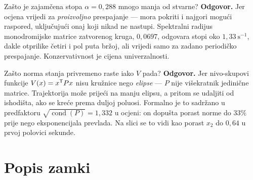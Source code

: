 \begin{pitanje}{Zašto je zajamčena stopa $\alpha = 0{,}288$ mnogo manja od stvarne?}
\textbf{Odgovor.} Jer ocjena vrijedi za \emph{proizvoljno} prespajanje --- mora
pokriti i najgori mogući raspored, uključujući onaj koji nikad ne nastupi.
Spektralni radijus monodromijske matrice zatvorenog kruga, $0{,}0697$, odgovara
stopi oko $1{,}33\ \mathrm{s}^{-1}$, dakle otprilike četiri i pol puta bržoj, ali
vrijedi samo za zadano periodičko prespajanje. Konzervativnost je cijena
univerzalnosti.
\end{pitanje}

\begin{pitanje}{Zašto norma stanja privremeno raste iako $V$ pada?}
\textbf{Odgovor.} Jer nivo-skupovi funkcije $V(x) = x^{\mathsf{T}} Px$ nisu kružnice
nego \emph{elipse} --- $P$ nije višekratnik jedinične matrice. Trajektorija može
prijeći na manju elipsu, a pritom se udaljiti od ishodišta, ako se kreće prema
duljoj poluosi. Formalno je to sadržano u predfaktoru
$\sqrt{\operatorname{cond}(P)} = 1{,}332$ u ocjeni: on dopušta porast norme do
$33\%$ prije nego eksponencijala prevlada. Na slici se to vidi kao porast $x_2$
do $0{,}64$ u prvoj polovici sekunde.
\end{pitanje}

\section{Popis zamki}
\label{sec:z4o-zamke}

